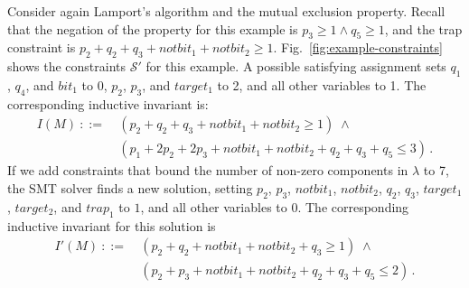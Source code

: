 Consider again Lamport's algorithm and the mutual
exclusion property. Recall that the negation of the property for this example is $p_3 \ge 1 \land q_5 \ge 1$, and the trap constraint is
$p_2 + q_2 + q_3 + notbit_1 + notbit_2 \ge 1$.
%
Fig.~\ref{fig:example-constraints} shows the constraints $\mathcal{S}'$ for this example. 
A possible satisfying assignment sets $q_1$, $q_4$, and
$bit_1$ to 0, $p_2$, $p_3$, and $target_1$ to 2, and all other
variables to 1.
The corresponding inductive invariant is:
\begin{align*}
I(M)\ ::=&\ (p_2 + q_2 + q_3 + notbit_1 + notbit_2 \ge 1 ) \; \land \\
&\ (p_1 + 2 p_2 + 2 p_3 + notbit_1 + notbit_2 + q_2 + q_3 + q_5 \le 3)\,.
\end{align*}
%
If we add constraints that bound the number of non-zero components in
$\lambda$ to 7, the SMT solver finds a new solution, setting $p_2$, $p_3$, $notbit_1$, $notbit_2$, $q_2$, $q_3$,
$target_1$, $target_2$, and $trap_1$ to $1$, and all other variables
to $0$. The corresponding inductive invariant for this solution is
\begin{align*}
I'(M)\ ::=&\ 
(p_2 + q_2 + notbit_1 + notbit_2 + q_3 \ge 1 ) \; \land \\
&\ (p_2 + p_3 + notbit_1 + notbit_2 + q_2 + q_3 + q_5 \le 2)\,.
\end{align*}



